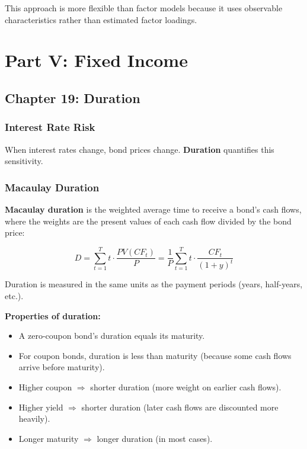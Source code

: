 \documentclass[11pt,letterpaper]{report}
\begin{document}
This approach is more flexible than factor models because it uses observable characteristics rather than estimated factor loadings.


\part{Part V: Fixed Income}



\chapter{Chapter 19: Duration}


\section{Interest Rate Risk}


When interest rates change, bond prices change.  \textbf{Duration} quantifies this sensitivity.

\section{Macaulay Duration}


\textbf{Macaulay duration} is the weighted average time to receive a bond's cash flows, where the weights are the present values of each cash flow divided by the bond price:

$$D = \sum_{t=1}^{T} t \cdot \frac{PV(CF_t)}{P} = \frac{1}{P} \sum_{t=1}^{T} t \cdot \frac{CF_t}{(1+y)^t}$$

Duration is measured in the same units as the payment periods (years, half-years, etc.).

\textbf{Properties of duration:}

\begin{itemize}
  \item A zero-coupon bond's duration equals its maturity.
  \item For coupon bonds, duration is less than maturity (because some cash flows arrive before maturity).
  \item Higher coupon $\Rightarrow$ shorter duration (more weight on earlier cash flows).
  \item Higher yield $\Rightarrow$ shorter duration (later cash flows are discounted more heavily).
  \item Longer maturity $\Rightarrow$ longer duration (in most cases).
\end{itemize}
\end{document}
